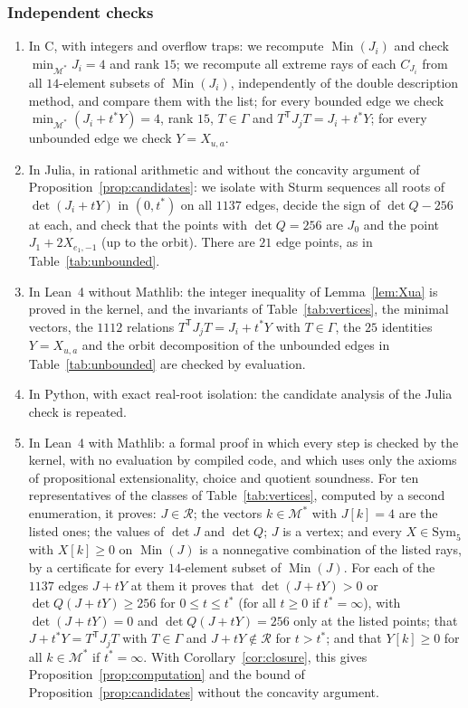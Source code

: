 \documentclass[11pt,reqno]{amsart}
\renewcommand{\_}{\origunderscore\allowbreak}
\numberwithin{equation}{section}
\theoremstyle{plain}
\theoremstyle{definition}
\theoremstyle{remark}
\newcommand{\M}{\mathcal{M}}
\newcommand{\Rk}{\mathcal{R}}
\newcommand{\Sym}{\mathrm{Sym}}
\newcommand{\Min}{\operatorname{Min}}
\begin{document}
\subsubsection*{Independent checks}
\begin{enumerate}
\item In C, with integers and overflow traps: we recompute $\Min(J_i)$ and check $\min_{\M^*}J_i=4$ and rank $15$; we recompute all extreme rays of each $C_{J_i}$ from all $14$-element subsets of $\Min(J_i)$, independently of the double description method, and compare them with the list; for every bounded edge we check $\min_{\M^*}(J_i+t^*Y)=4$, rank $15$, $T\in\Gamma$ and $T^{\mathsf T}J_jT=J_i+t^*Y$; for every unbounded edge we check $Y=X_{u,a}$.
\item In Julia, in rational arithmetic and without the concavity argument of Proposition~\ref{prop:candidates}: we isolate with Sturm sequences all roots of $\det(J_i+tY)$ in $(0,t^*)$ on all $1137$ edges, decide the sign of $\det Q-256$ at each, and check that the points with $\det Q=256$ are $J_0$ and the point $J_1+2X_{e_1,-1}$ (up to the orbit). There are $21$ edge points, as in Table~\ref{tab:unbounded}.
\item In Lean~4 without Mathlib: the integer inequality of Lemma~\ref{lem:Xua} is proved in the kernel, and the invariants of Table~\ref{tab:vertices}, the minimal vectors, the $1112$ relations $T^{\mathsf T}J_jT=J_i+t^*Y$ with $T\in\Gamma$, the $25$ identities $Y=X_{u,a}$ and the orbit decomposition of the unbounded edges in Table~\ref{tab:unbounded} are checked by evaluation.
\item In Python, with exact real-root isolation: the candidate analysis of the Julia check is repeated.
\item In Lean~4 with Mathlib: a formal proof in which every step is checked by the kernel, with no evaluation by compiled code, and which uses only the axioms of propositional extensionality, choice and quotient soundness. For ten representatives of the classes of Table~\ref{tab:vertices}, computed by a second enumeration, it proves: $J\in\Rk$; the vectors $k\in\M^*$ with $J[k]=4$ are the listed ones; the values of $\det J$ and $\det Q$; $J$ is a vertex; and every $X\in\Sym_5$ with $X[k]\ge0$ on $\Min(J)$ is a nonnegative combination of the listed rays, by a certificate for every $14$-element subset of $\Min(J)$. For each of the $1137$ edges $J+tY$ at them it proves that $\det(J+tY)>0$ or $\det Q(J+tY)\ge256$ for $0\le t\le t^*$ (for all $t\ge0$ if $t^*=\infty$), with $\det(J+tY)=0$ and $\det Q(J+tY)=256$ only at the listed points; that $J+t^*Y=T^{\mathsf T}J_jT$ with $T\in\Gamma$ and $J+tY\notin\Rk$ for $t>t^*$; and that $Y[k]\ge0$ for all $k\in\M^*$ if $t^*=\infty$. With Corollary~\ref{cor:closure}, this gives Proposition~\ref{prop:computation} and the bound of Proposition~\ref{prop:candidates} without the concavity argument.
\end{enumerate}
\end{document}
